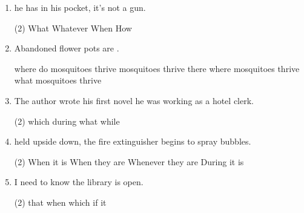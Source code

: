 \begin{enumerate}
\item \ttu he has in his pocket, it's not a gun.
\begin{tasks}(2)
  \task What
  \task Whatever
  \task When
  \task How
\end{tasks}

\item Abandoned flower pots are \ttu.
\begin{tasks}
  \task where do mosquitoes thrive
  \task mosquitoes thrive there
  \task where mosquitoes thrive
  \task what mosquitoes thrive
\end{tasks}

\item The author wrote his first novel \ttu he was working as a hotel clerk.
\begin{tasks}(2)
  \task which
  \task during
  \task what
  \task while
\end{tasks}

\item \ttu held upside down, the fire extinguisher begins to spray bubbles.
\begin{tasks}(2)
  \task When it is
  \task When they are
  \task Whenever they are
  \task During it is
\end{tasks}

\item I need to know \ttu the library is open.
\begin{tasks}(2)
  \task that
  \task when
  \task which
  \task if it
\end{tasks}

\end{enumerate}

